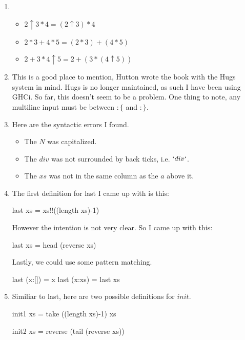 \documentclass{article}
\begin{document}
\begin{enumerate}
\item \begin{itemize}
\item $2 \uparrow 3 * 4 = (2 \uparrow 3 ) * 4$
\item $2 * 3 + 4 * 5 = (2*3) + (4 * 5)$
\item $2 + 3 *4 \uparrow 5 = 2 + ( 3 * (4 \uparrow 5))$
\end{itemize}

\item This is a good place to mention, Hutton wrote the book with the Hugs system in mind. Hugs is no longer maintained, as such I have been using GHCi. So far, this doesn't seem to be a problem. One thing to note, any multiline input must be between $:\{$ and $:\}$.


\item Here are the syntactic errors I found. 
\begin{itemize}
\item The $N$ was capitalized. 
\item The $div$ was not surrounded by back ticks, i.e. $`div`$. 
\item The $xs$ was not in the same column as the $a$ above it. 
\end{itemize}

\item The first definition for last I came up with is this:
\begin{code}
last xs = xs!!((length xs)-1)
\end{code}
However the intention is not very clear. So I came up with this:
\begin{code}
last xs = head (reverse xs)
\end{code}
Lastly, we could use some pattern matching.
\begin{code}
last (x:[]) = x
last (x:xs) = last xs
\end{code}

\item Similiar to last, here are two possible definitions for $init$.
\begin{code}
init1 xs = take ((length xs)-1) xs

init2 xs = reverse (tail (reverse xs))
\end{code}
\end{enumerate}
\end{document}

